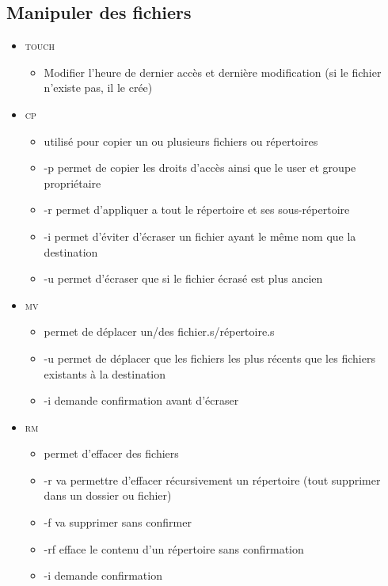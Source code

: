 \documentclass[a4paper]{article}
\begin{document}
    \subsection{Manipuler des fichiers}
    \begin{itemize}[label=\textbullet, font=\Large]
      \item \textsc{touch}
      \begin{itemize}[label=, font=\scriptsize]
        \item Modifier l'heure de dernier accès et dernière modification (si le fichier n'existe pas, il le crée)
      \end{itemize}
      \item \textsc{cp}
      \begin{itemize}[label=, font=\scriptsize]
        \item utilisé pour copier un ou plusieurs fichiers ou répertoires
        \item -p permet de copier les droits d'accès ainsi que le user et groupe propriétaire
        \item -r permet d'appliquer a tout le répertoire et ses sous-répertoire
        \item -i permet d'éviter d'écraser un fichier ayant le même nom que la destination
        \item -u permet d'écraser que si le fichier écrasé est plus ancien
      \end{itemize}
      \item \textsc{mv}
      \begin{itemize}[label=, font=\scriptsize]
        \item permet de déplacer un/des fichier.s/répertoire.s
        \item -u permet de déplacer que les fichiers les plus récents que les fichiers existants à la destination
        \item -i demande confirmation avant d'écraser
      \end{itemize}
      \item \textsc{rm}
      \begin{itemize}[label=, font=\scriptsize]
        \item permet d'effacer des fichiers
        \item -r va permettre d'effacer récursivement un répertoire (tout supprimer dans un dossier ou fichier)
        \item -f va supprimer sans confirmer
        \item -rf efface le contenu d'un répertoire sans confirmation
        \item -i demande confirmation
      \end{itemize}
    \end{itemize}
\end{document}
